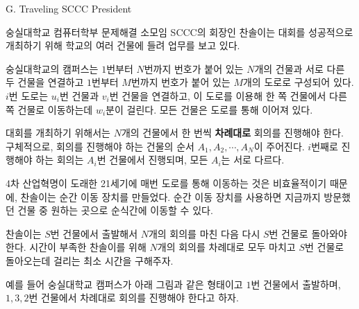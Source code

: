 \def\probtitle{Traveling SCCC President}
\def\probno{G}

\begin{problem}{\probno{}. \probtitle{}}

숭실대학교 컴퓨터학부 문제해결 소모임 SCCC의 회장인 찬솔이는 대회를 성공적으로 개최하기 위해 학교의 여러 건물에 들려 업무를 보고 있다.

숭실대학교의 캠퍼스는 $1$번부터 $N$번까지 번호가 붙어 있는 $N$개의 건물과 서로 다른 두 건물을 연결하고 $1$번부터 $M$번까지 번호가 붙어 있는 $M$개의 도로로 구성되어 있다. $i$번 도로는 $u_i$번 건물과 $v_i$번 건물을 연결하고, 이 도로를 이용해 한 쪽 건물에서 다른 쪽 건물로 이동하는데 $w_i$분이 걸린다. 모든 건물은 도로를 통해 이어져 있다.

대회를 개최하기 위해서는 $N$개의 건물에서 한 번씩 \textbf{차례대로} 회의를 진행해야 한다. 구체적으로, 회의를 진행해야 하는 건물의 순서 $A_1, A_2, \cdots, A_N$이 주어진다. $i$번째로 진행해야 하는 회의는 $A_i$번 건물에서 진행되며, 모든 $A_i$는 서로 다르다.

4차 산업혁명이 도래한 21세기에 매번 도로를 통해 이동하는 것은 비효율적이기 때문에, 찬솔이는 순간 이동 장치를 만들었다. 순간 이동 장치를 사용하면 지금까지 방문했던 건물 중 원하는 곳으로 순식간에 이동할 수 있다.

찬솔이는 $S$번 건물에서 출발해서 $N$개의 회의를 마친 다음 다시 $S$번 건물로 돌아와야 한다. 시간이 부족한 찬솔이를 위해 $N$개의 회의를 차례대로 모두 마치고 $S$번 건물로 돌아오는데 걸리는 최소 시간을 구해주자.

예를 들어 숭실대학교 캠퍼스가 아래 그림과 같은 형태이고 $1$번 건물에서 출발하며, $1, 3, 2$번 건물에서 차례대로 회의를 진행해야 한다고 하자.

\begin{center}
\end{center}


\end{problem}
